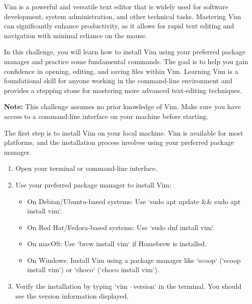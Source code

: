 
\begin{challenge}


\begin{chadescription}
Vim is a powerful and versatile text editor that is widely used for software development, system administration, and other technical tasks. Mastering Vim can significantly enhance productivity, as it allows for rapid text editing and navigation with minimal reliance on the mouse.

In this challenge, you will learn how to install Vim using your preferred package manager and practice some fundamental commands. The goal is to help you gain confidence in opening, editing, and saving files within Vim. Learning Vim is a foundational skill for anyone working in the command-line environment and provides a stepping stone for mastering more advanced text-editing techniques.

\textbf{Note:} This challenge assumes no prior knowledge of Vim. Make sure you have access to a command-line interface on your machine before starting.
\end{chadescription}

\begin{task}
The first step is to install Vim on your local machine. Vim is available for most platforms, and the installation process involves using your preferred package manager.

\begin{enumerate}
    \item Open your terminal or command-line interface.
    \item Use your preferred package manager to install Vim:
        \begin{itemize}
            \item On Debian/Ubuntu-based systems: Use `sudo apt update && sudo apt install vim`.
            \item On Red Hat/Fedora-based systems: Use `sudo dnf install vim`.
            \item On macOS: Use `brew install vim` if Homebrew is installed.
            \item On Windows: Install Vim using a package manager like `scoop` (`scoop install vim`) or `choco` (`choco install vim`).
        \end{itemize}
    \item Verify the installation by typing `vim --version` in the terminal. You should see the version information displayed.
\end{enumerate}
\end{task}


\end{challenge}
